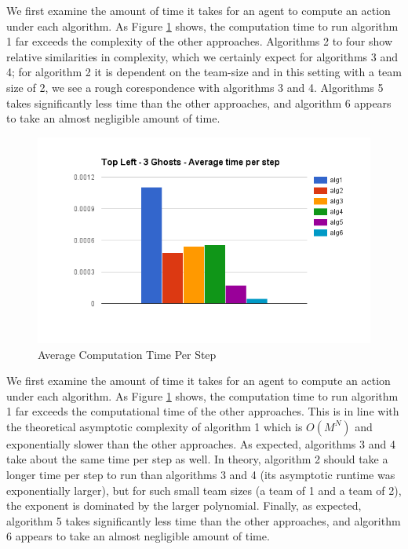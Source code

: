 \documentclass[11pt]{article}
\begin{document}
\begin{multicols}{2}
We first examine the amount of time it takes for an agent to compute an action under each algorithm. As Figure \ref{fig:averagecomputation} shows, the computation time to run algorithm 1 far exceeds the complexity of the other approaches. Algorithms 2 to four show relative similarities in complexity, which we certainly expect for algorithms 3 and 4; for algorithm 2 it is dependent on the team-size and in this setting with a team size of 2, we see a rough corespondence with algorithms 3 and 4. Algorithms 5 takes significantly less time than the other approaches, and algorithm 6 appears to take an almost negligible amount of time. 
\begin{figure}[H]
	\includegraphics[scale=0.45]{time.png}
	\caption{Average Computation Time Per Step}
	\label{fig:averagecomputation}
\end{figure}	

We first examine the amount of time it takes for an agent to compute an action under each algorithm. As Figure \ref{fig:averagecomputation} shows, the computation time to run algorithm 1 far exceeds the computational time of the other approaches. This is in line with the theoretical asymptotic complexity of algorithm 1 which is $O(M^N)$ and exponentially slower than the other approaches. As expected, algorithms 3 and 4 take about the same time per step as well. In theory, algorithm 2 should take a longer time per step to run than algorithms 3 and 4 (its asymptotic runtime was exponentially larger), but for such small team sizes (a team of 1 and a team of 2), the exponent is dominated by the larger polynomial. Finally, as expected, algorithm 5 takes significantly less time than the other approaches, and algorithm 6 appears to take an almost negligible amount of time. 


\end{multicols}
\end{document}
